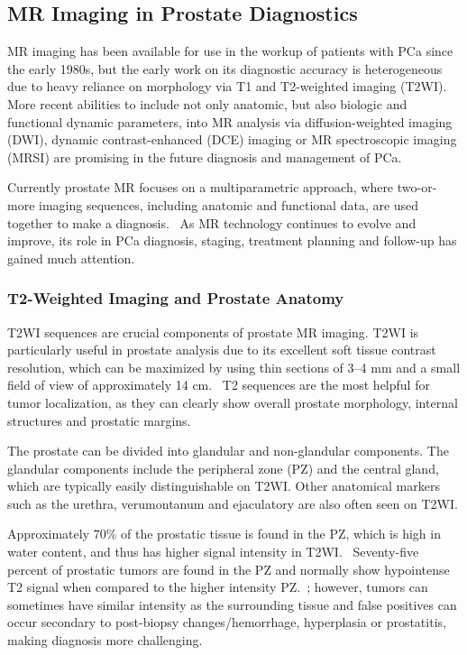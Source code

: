 ﻿\subsection{MR Imaging in Prostate Diagnostics}
MR imaging has been available for use in the workup of patients with PCa since
the early 1980s, but the early work on its diagnostic accuracy is heterogeneous
due to heavy reliance on morphology via T1 and T2-weighted imaging (T2WI). More
recent abilities to include not only anatomic, but also biologic and functional
dynamic parameters, into MR analysis via diffusion-weighted imaging (DWI),
dynamic contrast-enhanced (DCE) imaging or MR spectroscopic imaging (MRSI) are
promising in the future diagnosis and management of PCa.

Currently prostate MR focuses on a multiparametric approach, where two-or-more
imaging sequences, including anatomic and functional data, are used together to
make a diagnosis.~\cite{Barentsz2012} As MR technology continues to evolve and
improve, its role in PCa diagnosis, staging, treatment planning and follow-up
has gained much attention.

\subsubsection{T2-Weighted Imaging and Prostate Anatomy}
T2WI sequences are crucial components of prostate MR imaging.  T2WI is
particularly useful in prostate analysis due to its excellent soft tissue
contrast resolution, which can be maximized by using thin sections of 3--4 mm
and a small field of view of approximately 14 cm.~\cite{Gupta2013,Bonekamp2011}
T2 sequences are the most helpful for tumor localization, as they can clearly
show overall prostate morphology, internal structures and prostatic
margins.~\cite{Gupta2013}

The prostate can be divided into glandular and non-glandular components. The
glandular components include the peripheral zone (PZ) and the central gland,
which are typically easily distinguishable on T2WI.  Other anatomical markers
such as the urethra, verumontanum and ejaculatory are also often seen on T2WI. 

Approximately 70\% of the prostatic tissue is found in the PZ, which is high in
water content, and thus has higher signal intensity in T2WI.~\cite{Jung2012}
Seventy-five percent of prostatic tumors are found in the PZ and normally show
hypointense T2 signal when compared to the higher intensity
PZ.~\cite{Hricak2007,Hegde2013}; however, tumors can sometimes have similar
intensity as the surrounding tissue and false positives can occur secondary to
post-biopsy changes/hemorrhage, hyperplasia or prostatitis, making diagnosis
more challenging.~\cite{Hegde2013}


